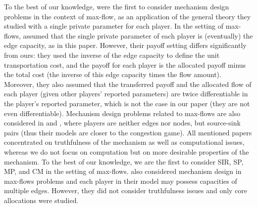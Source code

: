 To the best of our knowledge, \cite{archer2001truthful} were the first to consider mechanism design problems in the context of max-flow, as an application of the general theory they studied with a single private parameter for each player. In the setting of max-flows,  \cite{archer2001truthful} assumed that the single private parameter of each player is (eventually) the edge capacity, as in this paper. However, their payoff setting differs significantly from ours: they used the inverse of the edge capacity to define the unit transportation cost, and the payoff for each player is the allocated payoff minus the total cost (the inverse of this edge capacity times the flow amount). Moreover, they also assumed that the transferred payoff  and the allocated flow of each player (given other players' reported parameters) are twice differentiable in the player's reported parameter, which is not the case in our paper (they are not even differentiable). 
Mechanism design problems related to max-flows are also considered in \cite{lavi2011truthful} and \cite{liu2014mechanism}, where players are neither edges nor nodes, but source-sink pairs (thus their models are closer to the congestion game). 
All mentioned papers concentrated on truthfulness of the mechanism as well as computational issues, whereas we do not focus on computation but on more desirable properties of the mechanism. To the best of our knowledge, we are the first to consider SIR, SP, MP, and CM in the setting of max-flows.
\cite{agarwal2008mechanism} also considered mechanism design in max-flows problems and each player in their model may possess capacities of multiple edges. However, they did not consider truthfulness issues and only core allocations were studied.